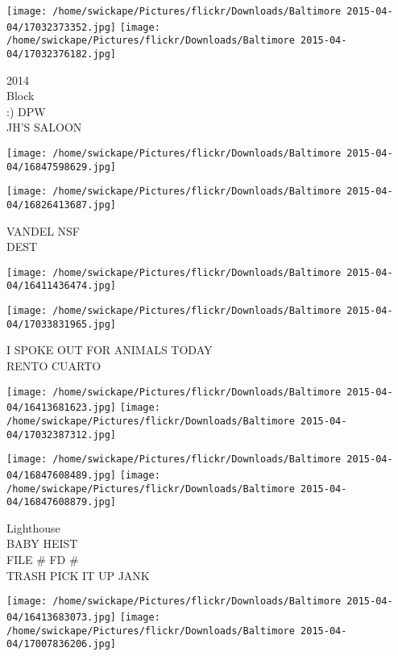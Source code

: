 \documentclass[10pt,letterpaper]{article}
\begin{document}
\texttt{[image: /home/swickape/Pictures/flickr/Downloads/Baltimore 2015-04-04/17032373352.jpg]}
\texttt{[image: /home/swickape/Pictures/flickr/Downloads/Baltimore 2015-04-04/17032376182.jpg]}

2014\\
Block\\
:) DPW\\
JH'S SALOON\\
\pagebreak

\texttt{[image: /home/swickape/Pictures/flickr/Downloads/Baltimore 2015-04-04/16847598629.jpg]}

\vspace{0.25in}
\texttt{[image: /home/swickape/Pictures/flickr/Downloads/Baltimore 2015-04-04/16826413687.jpg]}

VANDEL NSF\\
DEST\\
\pagebreak

\texttt{[image: /home/swickape/Pictures/flickr/Downloads/Baltimore 2015-04-04/16411436474.jpg]}

\vspace{0.25in}
\texttt{[image: /home/swickape/Pictures/flickr/Downloads/Baltimore 2015-04-04/17033831965.jpg]}

I SPOKE OUT FOR ANIMALS TODAY\\
RENTO CUARTO\\
\pagebreak

\texttt{[image: /home/swickape/Pictures/flickr/Downloads/Baltimore 2015-04-04/16413681623.jpg]}
\texttt{[image: /home/swickape/Pictures/flickr/Downloads/Baltimore 2015-04-04/17032387312.jpg]}

\texttt{[image: /home/swickape/Pictures/flickr/Downloads/Baltimore 2015-04-04/16847608489.jpg]}
\texttt{[image: /home/swickape/Pictures/flickr/Downloads/Baltimore 2015-04-04/16847608879.jpg]}

Lighthouse\\
BABY HEIST\\
FILE \# FD \#\\
TRASH PICK IT UP JANK\\
\pagebreak

\texttt{[image: /home/swickape/Pictures/flickr/Downloads/Baltimore 2015-04-04/16413683073.jpg]}
\texttt{[image: /home/swickape/Pictures/flickr/Downloads/Baltimore 2015-04-04/17007836206.jpg]}
\end{document}
